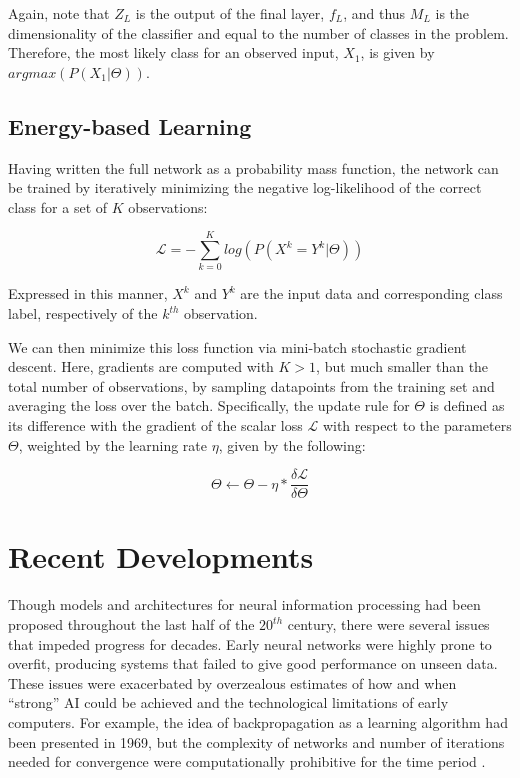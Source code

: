 \noindent Again, note that $Z_{L}$ is the output of the final layer, $f_L$, and thus $M_L$ is the dimensionality of the classifier and equal to the number of classes in the problem.
Therefore, the most likely class for an observed input, $X_1$, is given by $argmax(P(X_{1} | \Theta))$.

\subsection{Energy-based Learning}

Having written the full network as a probability mass function, the network can be trained by iteratively minimizing the negative log-likelihood of the correct class for a set of $K$ observations:

\begin{equation}
\label{eq:nll}
\mathcal{L}=-\sum_{k=0}^K log(P(X^k = Y^k \vert \Theta))
\end{equation}

\noindent Expressed in this manner, $X^k$ and $Y^k$ are the input data and corresponding class label, respectively of the $k^{th}$ observation.

We can then minimize this loss function via mini-batch stochastic gradient descent.
Here, gradients are computed with $K>1$, but much smaller than the total number of observations, by sampling datapoints from the training set and averaging the loss over the batch.
Specifically, the update rule for $\Theta$ is defined as its difference with the gradient of the scalar loss $\mathcal{L}$ with respect to the parameters $\Theta$, weighted by the learning rate $\eta$, given by the following:

\begin{equation}
\label{eq:updaterule}
\Theta \leftarrow \Theta - \eta * \frac{ \delta \mathcal{L}}{\delta \Theta}
\end{equation}


\section{Recent Developments}
\label{sec:example}

Though models and architectures for neural information processing had been proposed throughout the last half of the $20^{th}$ century, there were several issues that impeded progress for decades.
Early neural networks were highly prone to overfit, producing systems that failed to give good performance on unseen data.
These issues were exacerbated by overzealous estimates of how and when ``strong'' AI could be achieved and the technological limitations of early computers.
For example, the idea of backpropagation as a learning algorithm had been presented in 1969, but the complexity of networks and number of iterations needed for convergence were computationally prohibitive for the time period \cite{}.

